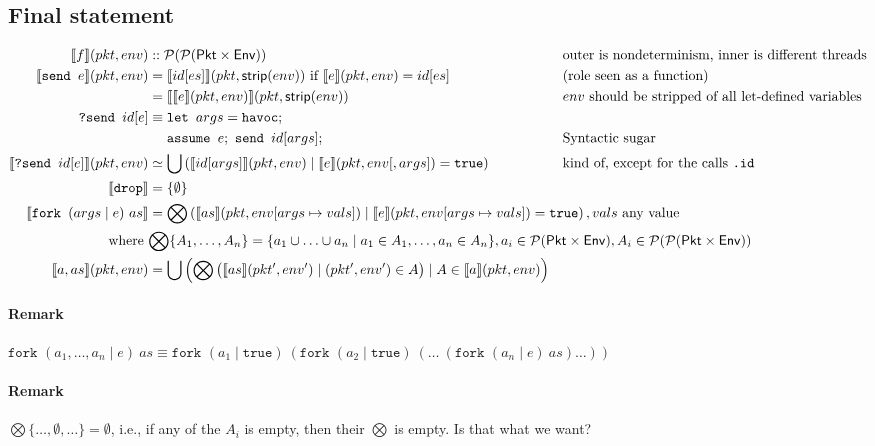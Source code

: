 \documentclass{report}
\newcommand\sem[1]{\llbracket #1\rrbracket}
\newcommand{\pkt}{\ensuremath{pkt}}
\newcommand{\env}{\ensuremath{env}}
\newcommand{\true}{\texttt{true}}
\begin{document}
\subsection{Final statement}
\begin{align*} 
\sem{f}(\pkt,\env) & :: \mathcal{P}(\mathcal{P}({\sf Pkt}\times{\sf Env})) &
&\text{outer is nondeterminism, inner is different threads}
\\
\sem{\texttt{send }e}(\pkt,\env) & =\sem{id[es]}(\pkt,\textsf{strip}(\env))
\text{ if }\sem{e}(\pkt,\env)=id[es] &
& \text{(role seen as a function)}
\\& = \sem{\sem{e}(\pkt,\env)}(\pkt,\textsf{strip}(\env))
&& \text{$env$ should be stripped of all \textrm{let}-defined variables}
\\
\texttt{?send }id[e] & \equiv
\texttt{let }args=\texttt{havoc};\\
&\quad\ \texttt{assume }e;\ \texttt{send }id[args];&
& \text{Syntactic sugar}
\\
\sem{\texttt{?send }id[e]}(\pkt,\env) & \simeq\bigcup\left(\sem{id[args]}(\pkt,\env)\mid\sem{e}(\pkt,\env[,args])=\true\right) &
& \text{kind of, except for the calls \texttt{.id}}
\\
\sem{\texttt{drop}} & = \{\emptyset\}
\\
\sem{\texttt{fork } (args\mid e)\ as} & =\rlap{$\displaystyle\bigotimes\left(\sem{as}(\pkt,\env[args\mapsto vals])\mid\sem{e}(\pkt,\env[args\mapsto vals])=\texttt{true}\right), vals\text{ any value}$}
\\
\text{where } & \rlap{$\displaystyle\bigotimes\{A_1,\ldots,A_n\}=\{a_1\cup\ldots\cup a_n\mid a_1\in A_1,\ldots,a_n\in A_n\}, a_i\in\mathcal P({\sf Pkt}\times{\sf Env}), A_i\in\mathcal P(\mathcal P({\sf Pkt}\times{\sf Env}))$}
\\
\sem{a,as}(\pkt,\env) & = \bigcup\left(\bigotimes\big(\sem{as}(\pkt',\env') \mid (\pkt',\env')\in A\big)
\mid A\in\sem{a}(\pkt,\env)\right)
\end{align*}

\paragraph{Remark} 
$\texttt{fork }(a_1,\ldots,a_n\mid e)\ as\equiv
\texttt{fork }(a_1\mid\true)\ (\texttt{fork } (a_2\mid\true)\ (\ldots\ (\texttt{fork }(a_n\mid e)\ as)\ldots))$

\paragraph{Remark} $\displaystyle\bigotimes\{\ldots,\emptyset,\ldots\}=\emptyset$, i.e.,
if any of the $A_i$ is empty, then their $\displaystyle\bigotimes$ is empty.
Is that what we want?
\end{document}
